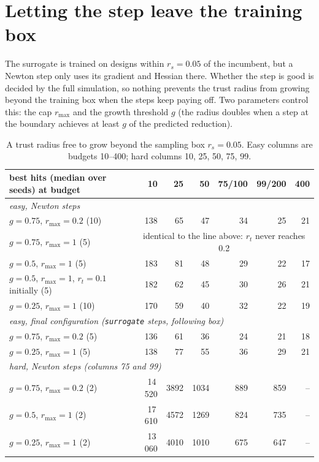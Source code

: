 \documentclass[11pt,a4paper]{article}
\begin{document}
\section{Letting the step leave the training box}\label{sec:far}

The surrogate is trained on designs within $r_s=0.05$ of the incumbent, but a Newton step only uses
its gradient and Hessian there. Whether the step is good is decided by the full simulation, so
nothing prevents the trust radius from growing beyond the training box when the steps keep paying
off. Two parameters control this: the cap $r_\text{max}$ and the growth threshold $g$ (the radius
doubles when a step at the boundary achieves at least $g$ of the predicted reduction).

\begin{table}[h]\centering\small
\begin{tabular}{lrrrrrr}
\toprule
best hits (median over seeds) at budget & 10 & 25 & 50 & 75/100 & 99/200 & 400 \\
\midrule
\multicolumn{7}{l}{\emph{easy, Newton steps}} \\
$g=0.75$, $r_\text{max}=0.2$ (10) & 138 & 65 & 47 & 34 & 25 & 21 \\
$g=0.75$, $r_\text{max}=1$ (5) & \multicolumn{6}{c}{identical to the line above: $r_t$ never reaches 0.2} \\
$g=0.5$, $r_\text{max}=1$ (5) & 183 & 81 & 48 & 29 & 22 & 17 \\
$g=0.5$, $r_\text{max}=1$, $r_t=0.1$ initially (5) & 182 & 62 & 45 & 30 & 26 & 21 \\
$g=0.25$, $r_\text{max}=1$ (10) & 170 & 59 & 40 & 32 & 22 & 19 \\
\multicolumn{7}{l}{\emph{easy, final configuration (\texttt{surrogate} steps, following box)}} \\
$g=0.75$, $r_\text{max}=0.2$ (5) & 136 & 61 & 36 & 24 & 21 & 18 \\
$g=0.25$, $r_\text{max}=1$ (5) & 138 & 77 & 55 & 36 & 29 & 21 \\
\midrule
\multicolumn{7}{l}{\emph{hard, Newton steps (columns 75 and 99)}} \\
$g=0.75$, $r_\text{max}=0.2$ (2) & 14\,520 & 3892 & 1034 & 889 & 859 & -- \\
$g=0.5$, $r_\text{max}=1$ (2) & 17\,610 & 4572 & 1269 & 824 & 735 & -- \\
$g=0.25$, $r_\text{max}=1$ (2) & 13\,060 & 4010 & 1010 & 675 & 647 & -- \\
\bottomrule
\end{tabular}
\caption{A trust radius free to grow beyond the sampling box $r_s=0.05$. Easy columns are budgets
10--400; hard columns 10, 25, 50, 75, 99.}
\label{tab:far}
\end{table}
\end{document}

